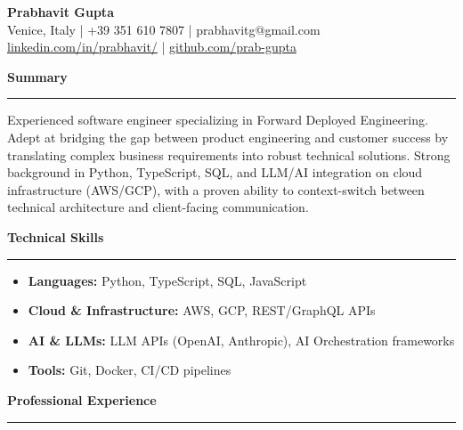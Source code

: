 \documentclass[11pt,a4paper]{article}
\begin{document}
\begin{center}
{\LARGE \textbf{Prabhavit Gupta}}\\
\vspace{0.5em}
Venice, Italy | +39 351 610 7807 | prabhavitg@gmail.com\\
\href{https://www.linkedin.com/in/prabhavit/}{linkedin.com/in/prabhavit/} | \href{https://github.com/prab-gupta}{github.com/prab-gupta}
\end{center}

\vspace{1em}

\noindent\textbf{\Large Summary}
\vspace{0.5em}\hrule\vspace{0.5em}
\noindent Experienced software engineer specializing in Forward Deployed Engineering. Adept at bridging the gap between product engineering and customer success by translating complex business requirements into robust technical solutions. Strong background in Python, TypeScript, SQL, and LLM/AI integration on cloud infrastructure (AWS/GCP), with a proven ability to context-switch between technical architecture and client-facing communication.

\vspace{1em}

\noindent\textbf{\Large Technical Skills}
\vspace{0.5em}\hrule\vspace{0.5em}
\begin{itemize}[leftmargin=*, nosep]
    \item \textbf{Languages:} Python, TypeScript, SQL, JavaScript
    \item \textbf{Cloud \& Infrastructure:} AWS, GCP, REST/GraphQL APIs
    \item \textbf{AI \& LLMs:} LLM APIs (OpenAI, Anthropic), AI Orchestration frameworks
    \item \textbf{Tools:} Git, Docker, CI/CD pipelines
\end{itemize}

\vspace{1em}

\noindent\textbf{\Large Professional Experience}
\vspace{0.5em}\hrule\vspace{0.5em}
\end{document}
